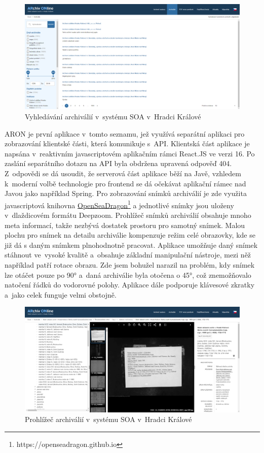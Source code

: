 \begin{figure}[htbp]
\centering
    \includegraphics[scale=.2]{obrazky-figures/archives/soaHradecKralove/vyhledani.png}
    \caption{Vyhledávání archiválií v~systému SOA v~Hradci Králové}
\end{figure}
\newpage
\noindent
ARON je první aplikace v~tomto seznamu, jež využívá separátní aplikaci pro zobrazování klientské části, která komunikuje s~API. Klientská část aplikace je napsána v~reaktivním javascriptovém aplikačním rámci React.JS ve verzi 16. Po zaslání separátního dotazu na API byla obdržena upravená odpověď 404. Z~odpovědi se dá usoudit, že serverová část aplikace běží na Javě, vzhledem k~moderní volbě technologie pro frontend se dá očekávat aplikační rámec nad Javou jako například Spring. Pro zobrazování snímků archiválií je zde využita javascriptová knihovna \href{https://openseadragon.github.io}{OpenSeaDragon}\footnote{https://openseadragon.github.io} a jednotlivé snímky jsou uloženy v~dlaždicovém formátu Deepzoom.
\newpara
Prohlížeč snímků archiválií obsahuje mnoho meta informací, takže nezbývá dostatek prostoru pro samotný snímek. Malou plochu pro snímek na detailu archiválie kompenzuje režim celé obrazovky, kde se již dá s daným snímkem plnohodnotně pracovat. Aplikace umožňuje daný snímek stáhnout ve~vysoké kvalitě a~obsahuje základní manipulační nástroje, mezi něž například patří rotace obrazu. Zde jsem bohužel narazil na problém, kdy snímek lze otáčet pouze po 90° a~daná archiválie byla otočena o 45°, což znemožňovalo natočení řádků do vodorovné polohy. Aplikace dále podporuje klávesové zkratky a~jako celek funguje velmi obstojně.

\begin{figure}[htbp]
\centering
    \includegraphics[scale=.2]{obrazky-figures/archives/soaHradecKralove/prohlizec.png}
    \caption{Prohlížeč archiválií v~systému SOA v~Hradci Králové}
\end{figure}

